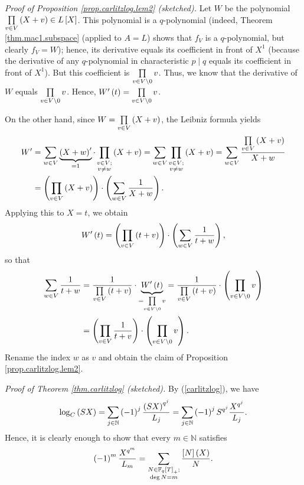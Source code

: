 \documentclass[numbers=enddot,12pt,final,onecolumn,notitlepage]{scrartcl}%
\theoremstyle{definition}
\let\sumnonlimits\sum
\let\prodnonlimits\prod
\renewcommand{\sum}{\sumnonlimits\limits}
\renewcommand{\prod}{\prodnonlimits\limits}
\begin{document}
\textit{Proof of Proposition \ref{prop.carlitzlog.lem2} (sketched).} Let $W$
be the polynomial $\prod\limits_{v\in V}\left(  X+v\right)  \in L\left[
X\right]  $. This polynomial is a $q$-polynomial (indeed, Theorem
\ref{thm.mac1.subspace} (applied to $A=L$) shows that $f_{V}$ is a
$q$-polynomial, but clearly $f_{V}=W$); hence, its derivative equals its
coefficient in front of $X^{1}$ (because the derivative of any $q$-polynomial
in characteristic $p\mid q$ equals its coefficient in front of $X^{1}$). But
this coefficient is $\prod\limits_{v\in V\setminus0}v$. Thus, we know that the
derivative of $W$ equals $\prod\limits_{v\in V\setminus0}v$. Hence,
$W^{\prime}\left(  t\right)  =\prod\limits_{v\in V\setminus0}v$.

On the other hand, since $W=\prod\limits_{v\in V}\left(  X+v\right)  $, the
Leibniz formula yields%
\begin{align*}
W^{\prime}  &  =\sum\limits_{w\in V}\underbrace{\left(  X+w\right)  ^{\prime}%
}_{=1}\cdot\prod\limits_{\substack{v\in V;\\v\neq w}}\left(  X+v\right)
=\sum\limits_{w\in V}\prod\limits_{\substack{v\in V;\\v\neq w}}\left(
X+v\right)  =\sum\limits_{w\in V}\dfrac{\prod\limits_{v\in V}\left(
X+v\right)  }{X+w}\\
&  =\left(  \prod\limits_{v\in V}\left(  X+v\right)  \right)  \cdot\left(
\sum\limits_{w\in V}\dfrac{1}{X+w}\right)  .
\end{align*}
Applying this to $X=t$, we obtain%
\[
W^{\prime}\left(  t\right)  =\left(  \prod\limits_{v\in V}\left(  t+v\right)
\right)  \cdot\left(  \sum\limits_{w\in V}\dfrac{1}{t+w}\right)  ,
\]
so that%
\begin{align*}
\sum\limits_{w\in V}\dfrac{1}{t+w}  &  =\dfrac{1}{\prod\limits_{v\in V}\left(
t+v\right)  }\cdot\underbrace{W^{\prime}\left(  t\right)  }_{=\prod
\limits_{v\in V\setminus0}v}=\dfrac{1}{\prod\limits_{v\in V}\left(
t+v\right)  }\cdot\left(  \prod\limits_{v\in V\setminus0}v\right) \\
&  =\left(  \prod\limits_{v\in V}\dfrac{1}{t+v}\right)  \cdot\left(
\prod\limits_{v\in V\setminus0}v\right)  .
\end{align*}
Rename the index $w$ as $v$ and obtain the claim of Proposition
\ref{prop.carlitzlog.lem2}.

\textit{Proof of Theorem \ref{thm.carlitzlog} (sketched).} By
(\ref{carlitzlog}), we have%
\[
\log_{C}\left(  SX\right)  =\sum\limits_{j\in\mathbb{N}}\left(  -1\right)
^{j}\dfrac{\left(  SX\right)  ^{q^{j}}}{L_{j}}=\sum\limits_{j\in\mathbb{N}%
}\left(  -1\right)  ^{j}S^{q^{j}}\dfrac{X^{q^{j}}}{L_{j}}.
\]
Hence, it is clearly enough to show that every $m\in\mathbb{N}$ satisfies%
\begin{equation}
\left(  -1\right)  ^{m}\dfrac{X^{q^{m}}}{L_{m}}=\sum\limits_{\substack{N\in
\mathbb{F}_{q}\left[  T\right]  _{+};\\\deg N=m}}\dfrac{\left[  N\right]
\left(  X\right)  }{N}. \label{pf.carlitzlog.1}%
\end{equation}
\end{document}
